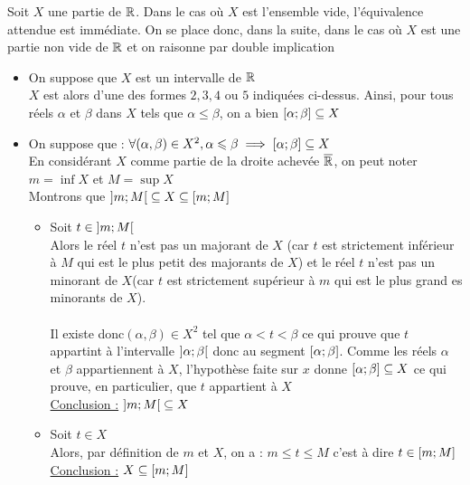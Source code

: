 \begin{dem}
    Soit \(X\) une partie de \(\mathbb{R}\).
    Dans le cas où \(X\) est l'ensemble vide, l'équivalence attendue est immédiate. On se place donc, dans la suite, dans le cas où \(X\) est une partie non vide de \(\mathbb{R}\) et on raisonne par double implication
    \begin{itemize}
        \item[\impdir] On suppose que \(X\) est un intervalle de \(\mathbb{R}\)\\
        \(X\) est alors d'une des formes \( 2, 3, 4\) ou \(5\) indiquées ci-dessus. Ainsi, pour tous réels \(\alpha\) et \(\beta\) dans \(X\) tels que \(\alpha \leq \beta\), on a bien \(\left[\alpha;\beta\right] \subseteq X\)
        \item[\imprec] On suppose que : \(\forall (\alpha,\beta) \in X^2, \alpha \leqslant \beta \implies \left[\alpha;\beta\right] \subseteq X \) \\
        En considérant \(X\) comme partie de la droite achevée \(\overline{\mathbb{R}}\), on peut noter \(m = \inf X\) et \(M = \sup X\) \\
        Montrons que \(\left]m;M\right[ \subseteq X \subseteq \left[m;M\right]\)
        \begin{itemize}
            \item Soit \(t\in \left]m;M\right[\) \\
            Alors le réel \(t\) n'est pas un majorant de \(X\) (car \(t\) est strictement inférieur à \(M\) qui est le plus petit des majorants de \(X\)) et le réel \(t\) n'est pas un minorant de \(X\)(car \(t\) est strictement supérieur à \(m\) qui est le plus grand es minorants de \(X\)). \\
            ~\\
            Il existe donc\((\alpha, \beta) \in X^2\) tel que \(\alpha <t<\beta\) ce qui prouve que \(t\) appartint à l'intervalle \(\left]\alpha;\beta\right[\) donc au segment \(\left[\alpha;\beta\right]\). Comme les réels \(\alpha\) et \(\beta\) appartiennent à \(X\), l'hypothèse faite sur \(x\) donne \(\left[\alpha;\beta\right] \subseteq X\) ce qui prouve, en particulier, que \(t\) appartient à \(X\)\\
            \underline{Conclusion :} \(\left]m;M\right[ \subseteq X\)
            \item Soit \(t\in X\)\\
            Alors, par définition de \(m\) et \(X\), on a : \(m\leq t\leq M\) c'est à dire \(t\in \left[m;M\right]\) \\
            \underline{Conclusion :} \(X \subseteq \left[m;M\right] \)
        \end{itemize} 

\end{itemize}
\end{dem}
